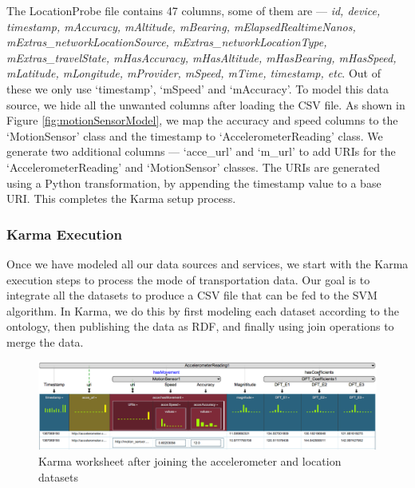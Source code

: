 The LocationProbe file contains 47 columns, some of them are --- \textit{id, device, timestamp, mAccuracy, mAltitude, mBearing, mElapsedRealtimeNanos, mExtras\_networkLocationSource, mExtras\_networkLocationType, mExtras\_travelState, mHasAccuracy, mHasAltitude, mHasBearing, mHasSpeed, mLatitude, mLongitude, mProvider, mSpeed, mTime, timestamp, etc}. Out of these we only use `timestamp', `mSpeed' and `mAccuracy'. To model this data source, we hide all the unwanted columns after loading the CSV file. As shown in Figure \ref{fig:motionSensorModel}, we map the accuracy and speed columns to the `MotionSensor' class and the timestamp to `AccelerometerReading' class. We generate two additional columns --- `acce\_url' and `m\_url' to add URIs for the `AccelerometerReading' and `MotionSensor' classes. The URIs are generated using a Python transformation, by appending the timestamp value to a base URI. This completes the Karma setup process.

\subsubsection{Karma Execution} 
Once we have modeled all our data sources and services, we start with the Karma execution steps to process the mode of transportation data. Our goal is to integrate all the datasets to produce a CSV file that can be fed to the SVM algorithm. In Karma, we do this by first modeling each dataset according to the ontology, then publishing the data as RDF, and finally using join operations to merge the data.

\begin{figure}[bp]
\centering
\includegraphics[width=184mm]{img/model_after_augmentation}
\caption{Karma worksheet after joining the accelerometer and location datasets}
\label{fig:model_after_augmentation}
\end{figure}

